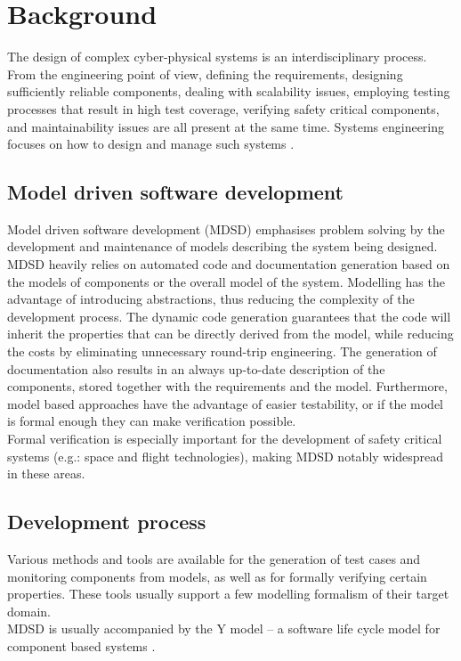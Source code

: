 %

\chapter{Background}
\label{chap:background}

The design of complex cyber-physical systems is an interdisciplinary process. From the engineering point of view, defining the requirements, designing sufficiently reliable components, dealing with scalability issues, employing testing processes that result in high test coverage, verifying safety critical components, and maintainability issues are all present at the same time. Systems engineering focuses on how to design and manage such systems \cite{randomwikipedialink1} \cite{randomwikipedialink2}. 
\section{Model driven software development}
Model driven software development (MDSD) emphasises problem solving by the development and maintenance of models describing the system being designed. MDSD heavily relies on automated code and documentation generation based on the models of components or the overall model of the system. Modelling has the advantage of introducing abstractions, thus reducing the complexity of the development process. The dynamic code generation guarantees that the code will inherit the properties that can be directly derived from the model, while reducing the costs by eliminating unnecessary round-trip engineering. The generation of documentation also results in an always up-to-date description of the components, stored together with the requirements and the model. Furthermore, model based approaches have the advantage of easier testability, or if the model is formal enough they can make verification possible.\\
Formal verification is especially important for the development of safety critical systems (e.g.: space and flight technologies), making MDSD notably widespread in these areas.
\section{Development process}
Various methods and tools are available for the generation of test cases and monitoring components from models, as well as for formally verifying certain properties. These tools usually support a few modelling formalism of their target domain.\\
MDSD is usually accompanied by the Y model -- a software life cycle model for component based systems \cite{ymodel}.
